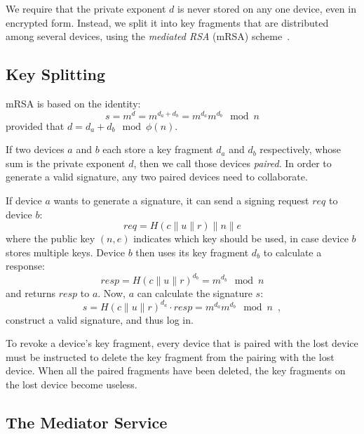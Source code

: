 \documentclass{llncs}
\newcommand*{\concat}{\mathbin{\|}}
\begin{document}
We require that the private exponent $d$ is never stored on any one device, even in encrypted form.
Instead, we split it into key fragments that are distributed among several devices, using the
\emph{mediated RSA} (mRSA) scheme~\cite{Boneh01,Kutyiowski12}.

\subsection{Key Splitting}\label{sec:splitting}

mRSA is based on the identity:
\begin{equation}
s = m^d = m^{d_a + d_b} = m^{d_a} m^{d_b} \mod n
\end{equation}
provided that $d = d_a + d_b \mod \phi(n)$.

If two devices $a$ and $b$ each store a key fragment $d_a$ and $d_b$ respectively, whose sum is the
private exponent $d$, then we call those devices \emph{paired}. In order to generate a valid
signature, any two paired devices need to collaborate.

If device $a$ wants to generate a signature, it can send a signing request $\mathit{req}$ to device $b$:
\begin{equation}
\mathit{req} = H(c \concat u \concat r) \concat n \concat e
\end{equation}
where the public key $(n, e)$ indicates which key should be used, in case device $b$ stores multiple
keys. Device $b$ then uses its key fragment $d_b$ to calculate a response:
\begin{equation}
\mathit{resp} = H(c \concat u \concat r)^{d_b} = m^{d_b} \mod n
\end{equation}
and returns $\mathit{resp}$ to $a$. Now, $a$ can calculate the signature $s$:
\begin{equation}
s = H(c \concat u \concat r)^{d_a} \cdot \mathit{resp} = m^{d_a} m^{d_b} \mod n \enspace,
\end{equation}
construct a valid signature, and thus log in.

To revoke a device's key fragment, every device that is paired with the lost device must be
instructed to delete the key fragment from the pairing with the lost device. When all the paired
fragments have been deleted, the key fragments on the lost device become useless.

\subsection{The Mediator Service}\label{sec:mediator}
\end{document}
